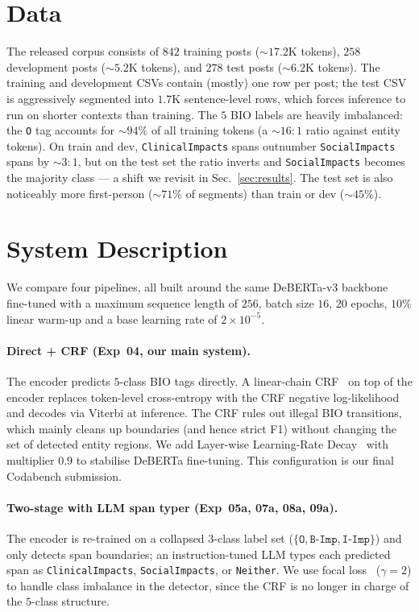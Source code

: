 \documentclass[11pt]{article}
\begin{document}
\section{Data}
\label{sec:data}

The released corpus consists of $842$ training posts ($\sim$$17.2$K
tokens), $258$ development posts ($\sim$$5.2$K tokens), and $278$
test posts ($\sim$$6.2$K tokens). The training and development CSVs
contain (mostly) one row per post; the test CSV is aggressively
segmented into $1.7$K sentence-level rows, which forces inference to
run on shorter contexts than training. The $5$ BIO labels are
heavily imbalanced: the \texttt{O} tag accounts for $\sim$$94\%$ of
all training tokens (a $\sim$$16{:}1$ ratio against entity tokens).
On train and dev, \texttt{ClinicalImpacts} spans outnumber
\texttt{SocialImpacts} spans by $\sim$$3{:}1$, but on the test set
the ratio inverts and \texttt{SocialImpacts} becomes the majority
class --- a shift we revisit in
Sec.~\ref{sec:results}. The test set is also noticeably more
first-person ($\sim$$71\%$ of segments) than train or
dev ($\sim$$45\%$).

\section{System Description}
\label{sec:system}

We compare four pipelines, all built around the same DeBERTa-v3
backbone fine-tuned with a maximum sequence length of $256$, batch
size $16$, $20$ epochs, $10\%$ linear warm-up and a base learning
rate of $2{\times}10^{-5}$.

\paragraph{Direct + CRF (Exp~04, our main system).} The encoder
predicts $5$-class BIO tags directly. A linear-chain
CRF~\cite{lafferty2001crf,lample2016neural} on top of the encoder
replaces token-level cross-entropy with the CRF negative
log-likelihood and decodes via Viterbi at inference. The CRF rules
out illegal BIO transitions, which mainly cleans up boundaries (and
hence strict F1) without changing the set of detected entity
regions. We add Layer-wise Learning-Rate
Decay~\cite{howard2018ulmfit} with multiplier $0.9$ to stabilise
DeBERTa fine-tuning. This configuration is our final Codabench
submission.

\paragraph{Two-stage with LLM span typer (Exp~05a, 07a, 08a, 09a).}
The encoder is re-trained on a collapsed $3$-class label set
($\{\texttt{O}, \texttt{B-Imp}, \texttt{I-Imp}\}$) and only detects
span boundaries; an instruction-tuned LLM types each predicted span
as \texttt{ClinicalImpacts}, \texttt{SocialImpacts}, or
\texttt{Neither}. We use focal loss~\cite{lin2017focal} ($\gamma{=}2$)
to handle class imbalance in the detector, since the CRF is no
longer in charge of the $5$-class structure.
\end{document}
